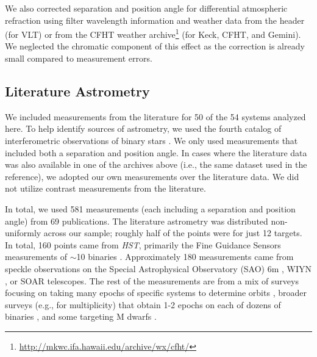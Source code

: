 \documentclass[twocolumn]{aastex62}
\begin{document}
We also corrected separation and position angle for differential atmospheric refraction \citep[DAR, ][]{2010SPIE.7736E..1IL} using filter wavelength information and weather data from the header (for VLT) or from the CFHT weather archive\footnote{\href{http://mkwc.ifa.hawaii.edu/archive/wx/cfht/}{http://mkwc.ifa.hawaii.edu/archive/wx/cfht/}} (for Keck, CFHT, and Gemini). We neglected the chromatic component of this effect as the correction is already small compared to measurement errors. 


\subsection{Literature Astrometry}\label{sec:litas}

We included measurements from the literature for 50 of the 54 systems analyzed here. %
To help identify sources of astrometry, we used the fourth catalog of interferometric observations of binary stars \citep[INT4,][]{Hartkopf:2001}. We only used measurements that included both a separation and position angle. In cases where the literature data was also available in one of the archives above (i.e., the same dataset used in the reference), we adopted our own measurements over the literature data. We did not utilize contrast measurements from the literature.

In total, we used 581 measurements (each including a separation and position angle) from 69 publications. The literature astrometry was distributed non-uniformly across our sample; roughly half of the points were for just 12 targets. In total, 160 points came from {\it HST}, primarily the Fine Guidance Sensors measurements of $\sim$10 binaries \citep[e.g.,][]{Benedict2016}. Approximately 180 measurements came from speckle observations on the Special Astrophysical Observatory (SAO) 6m \citep[e.g.,][]{Bag2002}, WIYN \citep[e.g.,][]{Hor2017}, or SOAR \citep[][]{Tok2017} telescopes. The rest of the measurements are from a mix of surveys focusing on taking many epochs of specific systems to determine orbits \citep[e.g.,][]{Koh2012}, broader surveys (e.g., for multiplicity) that obtain 1-2 epochs on each of dozens of binaries \citep[e.g.,][]{Jnn2012}, and some targeting M dwarfs \citep[e.g.,][]{Mason2018}.
\end{document}
